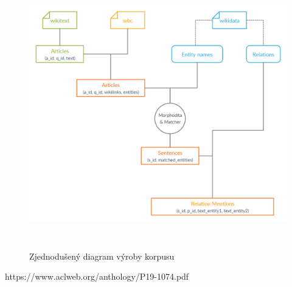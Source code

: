 




\begin{figure}[p]\centering
\includegraphics[width=140mm, height=117mm]{./img/Corpus_diagram}
\caption{Zjednodušený diagram výroby korpusu}
\label{obr03:Nhust}
\end{figure}


https://www.aclweb.org/anthology/P19-1074.pdf
